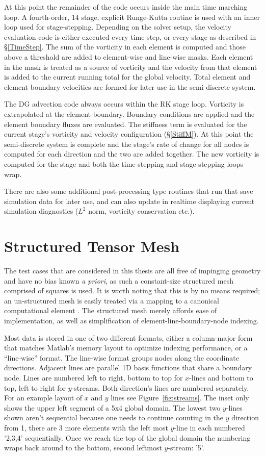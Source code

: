 \documentclass[letterpaper,12pt]{report}
\begin{document}
At this point the remainder of the code occurs inside the main time marching loop. A fourth-order, 14 stage, explicit Runge-Kutta routine is used with an inner loop used for stage-stepping. Depending on the solver setup, the velocity evaluation code is either executed every time step, or every stage as described in \S\ref{TimeStep}. The sum of the vorticity in each element is computed and those above a threshold are added to element-wise and line-wise masks. Each element in the mask is treated as a source of vorticity and the velocity from that element is added to the current running total for the global velocity. Total element and element boundary velocities are formed for later use in the semi-discrete system.

The DG advection code always occurs within the RK stage loop. Vorticity is extrapolated at the element boundary. Boundary conditions are applied and the element boundary fluxes are evaluated. The stiffness term is evaluated for the current stage's vorticity and velocity configuration (\S\ref{StiffM}). At this point the semi-discrete system is complete and the stage's rate of change for all nodes is computed for each direction and the two are added together. The new vorticity is computed for the stage and both the time-stepping and stage-stepping loops wrap.

There are also some additional post-processing type routines that run that save simulation data for later use, and can also update in realtime displaying current simulation diagnostics ($L^2$ norm, vorticity conservation etc.).

%
\section{Structured Tensor Mesh}\label{NodeNum}
The test cases that are considered in this thesis are all free of impinging geometry and have no bias known \textit{a priori}, as such a constant-size structured mesh comprised of squares is used. It is worth noting that this is by no means required; an un-structured mesh is easily treated via a mapping to a canonical computational element \cite{Persson2013}. The structured mesh merely affords ease of implementation, as well as simplification of element-line-boundary-node indexing.

Most data is stored in one of two different formats, either a column-major form that matches Matlab's memory layout to optimize indexing performance, or a ``line-wise'' format. The line-wise format groups nodes along the coordinate directions. Adjacent lines are parallel 1D basis functions that share a boundary node. Lines are numbered left to right, bottom to top for $x$-lines and bottom to top, left to right for $y$-streams. Both direction's lines are numbered separately. For an example layout of $x$ and $y$ lines see Figure~\ref{fig:streams}. The inset only shows the upper left segment of a 5x4 global domain. The lowest two $y$-lines shown aren't sequential because one needs to continue counting in the $y$ direction from 1, there are 3 more elements with the left most $y$-line in each numbered '2,3,4' sequentially. Once we reach the top of the global domain the numbering wraps back around to the bottom, second leftmost $y$-stream: '5'.
\end{document}
